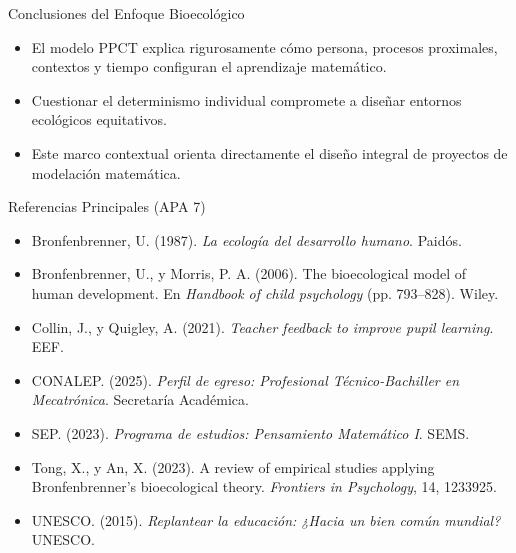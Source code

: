 \documentclass[aspectratio=169,spanish,xcolor=table]{beamer}
\begin{document}
\begin{frame}{Conclusiones del Enfoque Bioecológico}
  \begin{itemize}\normalsize
    \item El modelo PPCT explica rigurosamente cómo persona, procesos proximales, contextos y tiempo configuran el aprendizaje matemático.
    \item Cuestionar el determinismo individual compromete a diseñar entornos ecológicos equitativos.
    \item Este marco contextual orienta directamente el diseño integral de proyectos de modelación matemática.
  \end{itemize}
\end{frame}

\begin{frame}{Referencias Principales (APA 7)}
  \scriptsize\setlength{\parskip}{5pt}
  \begin{itemize}
    \item Bronfenbrenner, U. (1987). \textit{La ecología del desarrollo humano}. Paidós.
    \item Bronfenbrenner, U., y Morris, P. A. (2006). The bioecological model of human development. En \textit{Handbook of child psychology} (pp. 793--828). Wiley.
    \item Collin, J., y Quigley, A. (2021). \textit{Teacher feedback to improve pupil learning}. EEF.
    \item CONALEP. (2025). \textit{Perfil de egreso: Profesional Técnico-Bachiller en Mecatrónica}. Secretaría Académica.
    \item SEP. (2023). \textit{Programa de estudios: Pensamiento Matemático I}. SEMS.
    \item Tong, X., y An, X. (2023). A review of empirical studies applying Bronfenbrenner's bioecological theory. \textit{Frontiers in Psychology}, 14, 1233925.
    \item UNESCO. (2015). \textit{Replantear la educación: ¿Hacia un bien común mundial?} UNESCO.
  \end{itemize}
\end{frame}
\end{document}

